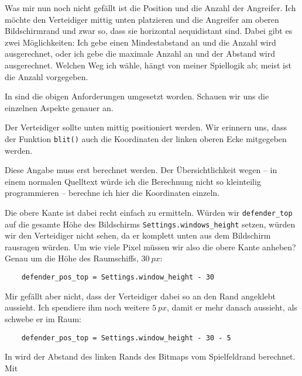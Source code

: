 Was mir nun noch nicht gefällt ist die Position und die Anzahl der Angreifer. Ich möchte den Verteidiger mittig unten platzieren und die Angreifer am oberen Bildschirmrand und zwar so, dass sie horizontal  \gls{aequidistant} sind. Dabei gibt es zwei Möglichkeiten: Ich gebe einen Mindestabstand an und die Anzahl wird ausgerechnet, oder ich gebe die maximale Anzahl an und der Abstand wird ausgerechnet. Welchen Weg ich wähle, hängt von meiner Spiellogik ab; meist ist die Anzahl vorgegeben.


In  sind die obigen Anforderungen umgesetzt worden. Schauen wir uns die einzelnen Aspekte genauer an.

Der Verteidiger sollte unten mittig positioniert werden. Wir erinnern uns, dass der Funktion \texttt{blit()} auch die Koordinaten der linken oberen Ecke mitgegeben werden. 

Diese Angabe muss erst berechnet werden. Der Übersichtlichkeit wegen -- in einem normalen Quelltext würde ich die Berechnung nicht so kleinteilig programmieren -- berechne ich hier die Koordinaten einzeln.

Die obere Kante ist dabei recht einfach zu ermitteln. Würden wir \texttt{defender\_top} auf die gesamte Höhe des Bildschirms \texttt{Settings.windows\_height} setzen, würden wir den Verteidiger nicht sehen, da er komplett unten aus dem Bildschirm rausragen würden. Um wie viele Pixel müssen wir also die obere Kante anheben? Genau um die Höhe des Raumschiffs, $30~px$:

\lstset{firstnumber=24}
\begin{lstlisting}
	defender_pos_top = Settings.window_height - 30
\end{lstlisting}

Mir gefällt aber nicht, dass der Verteidiger dabei so an den Rand angeklebt aussieht. Ich spendiere ihm noch weitere $5~px$, damit er mehr danach aussieht, als schwebe er im Raum:

\lstset{firstnumber=24}
\begin{lstlisting}
	defender_pos_top = Settings.window_height - 30 - 5
\end{lstlisting}

In  wird der Abstand des linken Rands des Bitmaps vom Spielfeldrand berechnet. Mit

